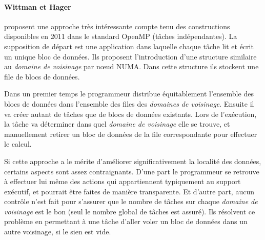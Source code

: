 \paragraph{Wittman et Hager~\cite{Wittmann2011}} proposent une approche très intéressante compte tenu des constructions disponibles en 2011 dans le standard OpenMP (tâches indépendantes).
La supposition de départ est une application dans laquelle chaque tâche lit et écrit un unique bloc de données.
Ils proposent l'introduction d'une structure similaire au \emph{domaine de voisinage} par nœud NUMA.
Dans cette structure ils stockent une file de blocs de données.

Dans un premier temps le programmeur distribue équitablement l'ensemble des blocs de données dans l'ensemble des files des \emph{domaines de voisinage}.
Ensuite il va créer autant de tâches que de blocs de données existants.
Lors de l'exécution, la tâche va déterminer dans quel \emph{domaine de voisinage} elle se trouve, et manuellement retirer un bloc de données de la file correspondante pour effectuer le calcul.

Si cette approche a le mérite d'améliorer significativement la localité des données, certains aspects sont assez contraignants.
D'une part le programmeur se retrouve à effectuer lui même des actions qui appartiennent typiquement au support exécutif, et pourrait être faites de manière transparente.
Et d'autre part, aucun contrôle n'est fait pour s'assurer que le nombre de tâches sur chaque \emph{domaine de voisinage} est le bon (seul le nombre global de tâches est assuré).
Ils résolvent ce problème en permettant à une tâche d'aller voler un bloc de données dans un autre voisinage, si le sien est vide.


